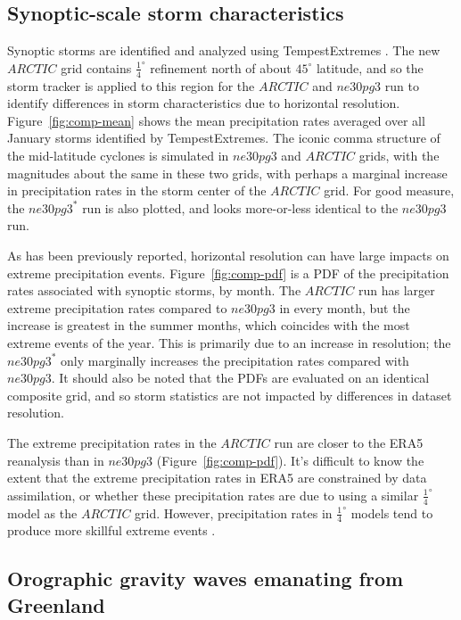 \documentclass[draft]{agujournal2019}
\begin{document}
\subsection{Synoptic-scale storm characteristics}
Synoptic storms are identified and analyzed using TempestExtremes \cite{UETAL2021}. The new $ARCTIC$ grid contains $\frac{1}{4}^{\circ}$ refinement north of about $45^{\circ}$ latitude, and so the storm tracker is applied to this region for the $ARCTIC$ and $ne30pg3$ run to identify differences in storm characteristics due to horizontal resolution. Figure~\ref{fig:comp-mean} shows the mean precipitation rates averaged over all January storms identified by TempestExtremes. The iconic comma structure of the mid-latitude cyclones is simulated in $ne30pg3$ and $ARCTIC$ grids, with the magnitudes about the same in these two grids, with perhaps a marginal increase in precipitation rates in the storm center of the $ARCTIC$ grid. For good measure, the $ne30pg3^{*}$ run is also plotted, and looks more-or-less identical to the $ne30pg3$ run.

As has been previously reported, horizontal resolution can have large impacts on extreme precipitation events. Figure~\ref{fig:comp-pdf} is a PDF of the precipitation rates associated with synoptic storms, by month. The $ARCTIC$ run has larger extreme precipitation rates compared to $ne30pg3$ in every month, but the increase is greatest in the summer months, which coincides with the most extreme events of the year. This is primarily due to an increase in resolution; the $ne30pg3^{*}$ only marginally increases the precipitation rates compared with $ne30pg3$. It should also be noted that the PDFs are evaluated on an identical composite grid, and so storm statistics are not impacted by differences in dataset resolution.

The extreme precipitation rates in the $ARCTIC$ run are closer to the ERA5 reanalysis than in $ne30pg3$ (Figure~\ref{fig:comp-pdf}). It's difficult to know the extent that the extreme precipitation rates in ERA5 are constrained by data assimilation, or whether these precipitation rates are due to using a similar $\frac{1}{4}^{\circ}$ model as the $ARCTIC$ grid. However, precipitation rates in $\frac{1}{4}^{\circ}$ models tend to produce more skillful extreme events \cite{OETAL2016JAMES}. 

\subsection{Orographic gravity waves emanating from Greenland}
\end{document}
